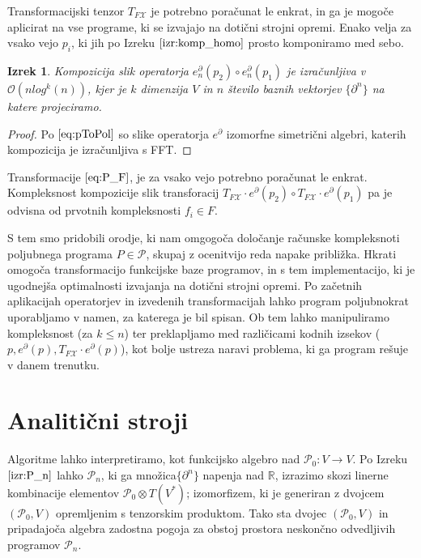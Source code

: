 \documentclass{article}
\newcommand{\RR}{\mathbb{R}}
\newcommand{\X}{\mathcal{X}}
\newcommand{\dP}{\mathcal{P}}
\newcommand{\D}{\partial}
\newtheorem{izrek}{Izrek}[section]
\begin{document}
Transformacijski tenzor $T_{F\X}$ je potrebno poračunat le enkrat, in ga je mogoče aplicirat na vse programe, ki se izvajajo na dotični strojni opremi. Enako velja za vsako vejo $p_i$, ki jih po Izreku $\ref{izr:komp_homo}$ prosto komponiramo med sebo.

\begin{izrek}
Kompozicija slik operatorja $e_n^\D(p_2)\circ e_n^\D(p_1)$ je izračunljiva v $\mathcal{O}(nlog^k(n))$, kjer je $k$ dimenzija $V$ in $n$ število baznih vektorjev $\{\D^n\}$ na katere projeciramo.
\end{izrek}

\begin{proof}
	Po $\eqref{eq:pToPol}$ so slike operatorja $e^\D$ izomorfne simetrični algebri, katerih kompozicija je izračunljiva s FFT.
\end{proof}

Transformacije $\eqref{eq:P_F}$, je za vsako vejo potrebno poračunat le enkrat. Kompleksnost kompozicije slik transforacij $T_{F\X}\cdot e^\D(p_2)\circ T_{F\X}\cdot e^\D(p_1)$ pa je odvisna od prvotnih kompleksnosti $f_i\in F$.

S tem smo pridobili orodje, ki nam omgogoča določanje računske kompleksnoti poljubnega programa $P\in\dP$, skupaj z ocenitvijo reda napake približka. Hkrati omogoča transformacijo funkcijske baze programov, in s tem implementacijo, ki je ugodnejša optimalnosti izvajanja na dotični strojni opremi. Po začetnih aplikacijah operatorjev in izvedenih transformacijah lahko program poljubnokrat uporabljamo v namen, za katerega je bil spisan. Ob tem lahko manipuliramo kompleksnost (za $k\le n$) ter preklapljamo med različicami kodnih izsekov ($p,e^\D(p),T_{F\X}\cdot e^\D(p)$), kot bolje ustreza naravi problema, ki ga program rešuje v danem trenutku.

\section{Analitični stroji}
Algoritme lahko interpretiramo, kot funkcijsko algebro nad $\dP_0:V\to V$. 
Po Izreku $\ref{izr:P_n}$ lahko $\dP_n$, ki ga množica$\{\D^n\}$ napenja nad $\RR$, izrazimo skozi linerne kombinacije elementov $\dP_0\otimes T(V^*)$; izomorfizem, ki je generiran z dvojcem $(\dP_0,V)$ opremljenim s tenzorskim produktom. Tako sta dvojec $(\dP_0,V)$ in pripadajoča algebra zadostna pogoja za obstoj prostora neskončno odvedljivih programov $\dP_n$.
\end{document}
